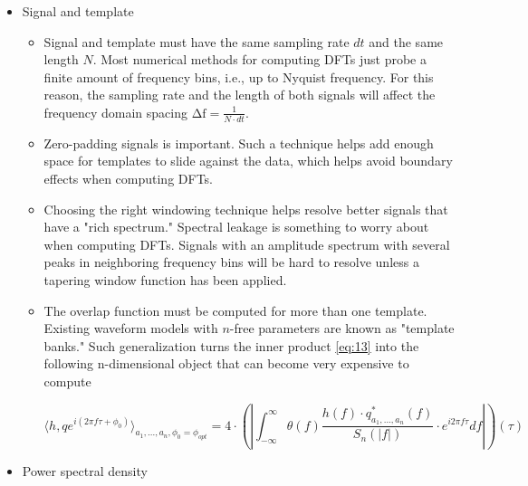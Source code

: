 \begin{itemize}

\item Signal and template
	\begin{itemize}
	
	\item Signal and template must have the same sampling rate $dt$ and the same length $N$. Most numerical methods for computing DFTs just probe a finite amount of frequency bins, i.e., up to Nyquist frequency. For this reason, the sampling rate and the length of both signals will affect the frequency domain spacing $\mathrm{\Delta f}=\frac{1}{N\cdot dt}$.
	
	\item Zero-padding signals is important. Such a technique helps add enough space for templates to slide against the data, which helps avoid boundary effects when computing DFTs.
	\item Choosing the right windowing technique helps resolve better signals that have a "rich spectrum." Spectral leakage is something to worry about when computing DFTs. Signals with an amplitude spectrum with several peaks in neighboring frequency bins will be hard to resolve unless a tapering window function has been applied.
	
	\item The overlap function must be computed for more than one template. Existing waveform models with $n$-free parameters are known as "template banks." Such generalization turns the inner product \ref{eq:13} into the following n-dimensional object that can become very expensive to compute
	
\begin{equation}\label{inn}
\langle h,q e^{i(2\pi f \tau + \phi_0)} \rangle_{a_1, ..., a_n,\phi_0=\phi_{opt}} =4\cdot \left( \left| \int_{-\infty}^{\infty} \theta(f)\frac{h(f) \cdot q^{*}_{a_1, ..., a_n}(f) }{S_n(|f|)} \cdot e^{i 2\pi f \tau} df \right| \right)(\tau)
\end{equation}

	\end{itemize}
	
\item Power spectral density
	\begin{itemize}
	

\end{itemize}
\end{itemize}
